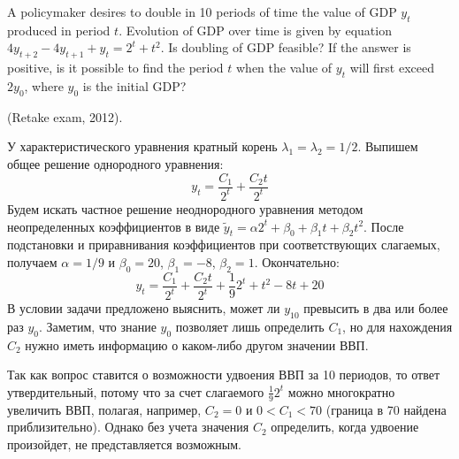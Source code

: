 \begin{problem}
A policymaker desires to double in 10 periods of time the value of GDP $y_t$  produced in period $t$. Evolution of GDP over time is given by equation $4y_{t+2}-4y_{t+1}+y_t=2^t+t^2$. Is doubling of GDP feasible? If the answer is positive, is it possible to find the period $t$ when the value of $y_t$  will first exceed $2y_0$, where $y_0$ is the initial GDP?

(Retake exam, 2012).


\begin{sol}
У характеристического уравнения кратный корень $\lambda_1=\lambda_2=1/2$. Выпишем общее решение однородного уравнения:
\[
y_t=\frac{C_1}{2^t}+\frac{C_2 t}{2^t}
\]
Будем искать частное решение неоднородного уравнения методом неопределенных коэффициентов в виде  $\tilde{y}_t=\alpha 2^t +\beta_0 + \beta_1 t+ \beta_2 t^2$. После подстановки и приравнивания коэффициентов при соответствующих слагаемых, получаем  $\alpha=1/9$ и $\beta_0=20$, $\beta_1=-8$, $\beta_2=1$. Окончательно:
\[
y_t=\frac{C_1}{2^t}+\frac{C_2 t}{2^t}+\frac{1}{9}2^t + t^2-8t+20
\]
В условии задачи предложено выяснить, может ли  $y_{10}$ превысить в два или более раз  $y_0$. Заметим, что знание  $y_0$ позволяет лишь определить  $C_1$, но для нахождения  $C_2$ нужно иметь информацию о каком-либо другом значении ВВП.

Так как вопрос ставится о возможности удвоения ВВП за 10 периодов, то ответ утвердительный, потому что за счет слагаемого  $\frac{1}{9}2^t$ можно многократно увеличить ВВП, полагая, например, $C_2=0$   и $0<C_1<70$  (граница в 70 найдена приблизительно). Однако без учета значения $C_2$  определить, когда удвоение произойдет, не представляется возможным.
\end{sol}
\end{problem}


